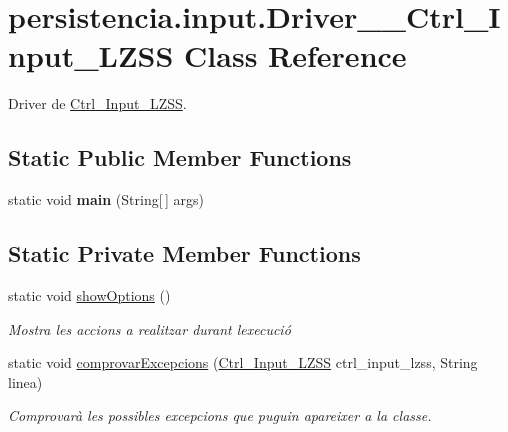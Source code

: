 \hypertarget{classpersistencia_1_1input_1_1Driver____Ctrl__Input__LZSS}{}\section{persistencia.\+input.\+Driver\+\_\+\+\_\+\+Ctrl\+\_\+\+Input\+\_\+\+L\+Z\+SS Class Reference}
\label{classpersistencia_1_1input_1_1Driver____Ctrl__Input__LZSS}


Driver de \hyperlink{classpersistencia_1_1input_1_1Ctrl__Input__LZSS}{Ctrl\+\_\+\+Input\+\_\+\+L\+Z\+SS}.  


\subsection*{Static Public Member Functions}
\begin{DoxyCompactItemize}
\item 
\mbox{\label{classpersistencia_1_1input_1_1Driver____Ctrl__Input__LZSS_a28b3106d1ed28319e5a7066c975da375}} 
static void {\bfseries main} (String\mbox{[}$\,$\mbox{]} args)
\end{DoxyCompactItemize}
\subsection*{Static Private Member Functions}
\begin{DoxyCompactItemize}
\item 
\mbox{\label{classpersistencia_1_1input_1_1Driver____Ctrl__Input__LZSS_a8221302c3603529654a83e02b976c662}} 
static void \hyperlink{classpersistencia_1_1input_1_1Driver____Ctrl__Input__LZSS_a8221302c3603529654a83e02b976c662}{show\+Options} ()
\begin{DoxyCompactList}\small\item\em Mostra les accions a realitzar durant l\textquotesingle{}execució \end{DoxyCompactList}\item 
static void \hyperlink{classpersistencia_1_1input_1_1Driver____Ctrl__Input__LZSS_a221f978664fc97bdab3b18d3c5f55155}{comprovar\+Excepcions} (\hyperlink{classpersistencia_1_1input_1_1Ctrl__Input__LZSS}{Ctrl\+\_\+\+Input\+\_\+\+L\+Z\+SS} ctrl\+\_\+input\+\_\+lzss, String linea)
\begin{DoxyCompactList}\small\item\em Comprovarà les possibles excepcions que puguin apareixer a la classe. \end{DoxyCompactList}\end{DoxyCompactItemize}


